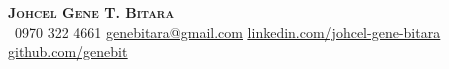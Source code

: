 \begin{center}
    \textbf{\Huge \scshape Johcel Gene T. Bitara} \\ \vspace{1pt}
     \ \small 0970 322 4661 \quad
    \href{mailto:genebitara@gmail.com}{ \underline{genebitara@gmail.com}} \quad
    \href{https://www.linkedin.com/in/johcel-gene-bitara-a413b9283}{ \underline{linkedin.com/johcel-gene-bitara}} \quad
    \href{https://github.com/genebit}{ \underline{github.com/genebit}}
\end{center}